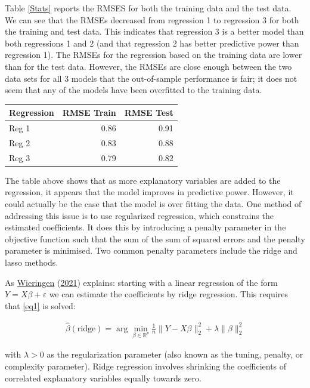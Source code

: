 \documentclass[11pt,preprint, authoryear]{elsarticle}
\let\origtable\table
\let\endorigtable\endtable
\renewenvironment{table}[1][2] {
    \expandafter\origtable\expandafter[H]
} {
    \endorigtable
}
\numberwithin{equation}{section}
\numberwithin{figure}{section}
\numberwithin{table}{section}
\begin{document}
Table \ref{Stats} reports the RMSES for both the training data and the
test data. We can see that the RMSEs decreased from regression 1 to
regression 3 for both the training and test data. This indicates that
regression 3 is a better model than both regressions 1 and 2 (and that
regression 2 has better predictive power than regression 1). The RMSEs
for the regression based on the training data are lower than for the
test data. However, the RMSEs are close enough between the two data sets
for all 3 models that the out-of-sample performance is fair; it does not
seem that any of the models have been overfitted to the training data.

\begin{table}[H]
\centering
\caption{Regression RMSEs and Observations} 
\label{Stats}
\begin{tabular}{lrr}
  \hline
Regression & RMSE Train & RMSE Test \\ 
  \hline
Reg 1 & 0.86 & 0.91 \\ 
  Reg 2 & 0.83 & 0.88 \\ 
  Reg 3 & 0.79 & 0.82 \\ 
   \hline
\end{tabular}
\end{table}

The table above shows that as more explanatory variables are added to
the regression, it appears that the model improves in predictive power.
However, it could actually be the case that the model is over fitting
the data. One method of addressing this issue is to use regularized
regression, which constrains the estimated coefficients. It does this by
introducing a penalty parameter in the objective function such that the
sum of the sum of squared errors and the penalty parameter is minimised.
Two common penalty parameters include the ridge and lasso methods.

As \protect\hyperlink{ref-ridg}{Wieringen}
(\protect\hyperlink{ref-ridg}{2021}) explains: starting with a linear
regression of the form \(Y=X \beta+\varepsilon\) we can estimate the
coefficients by ridge regression. This requires that \ref{eq1} is
solved:

\begin{align}
\hat{\beta}(\text{ridge})=\arg \min _{\beta \in \mathbb{R}^{p}} \frac{1}{n}\|Y-X \beta\|_{2}^{2}+\lambda\|\beta\|_{2}^{2} \label{eq1}
\end{align}

with \(\lambda>0\) as the regularization parameter (also known as the
tuning, penalty, or complexity parameter). Ridge regression involves
shrinking the coefficients of correlated explanatory variables equally
towards zero.
\end{document}
